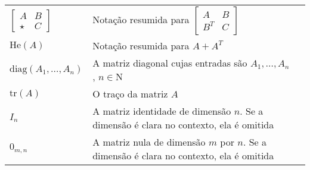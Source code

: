 \begin{spacing}{1.45}
\begin{longtable}{L{3.5cm}L{12cm}L{\textwidth}}
$\begin{bmatrix} A & B \\ \star & C \end{bmatrix}$ & Notação resumida para $\begin{bmatrix} A & B \\ B^T & C \end{bmatrix}$ & \\[12pt]

$\mathrm{He}(A)$ & Notação resumida para $A + A^T$ & \\[8pt]

$\mathrm{diag}(A_1, \ldots, A_n)$ & A matriz diagonal cujas entradas são $A_1, \ldots, A_n$, $n \in \mathrm{N}$  & \\[8pt]

$\mathrm{tr}(A)$ & O traço da matriz $A$  & \\[8pt]

$I_n$ & A matriz identidade de dimensão $n$. Se a dimensão é clara no contexto, ela é omitida & \\[8pt]

$0_{m, n}$ & A matriz nula de dimensão $m$ por $n$. Se a dimensão é clara no contexto, ela é omitida & \\[8pt]


\end{longtable}

\end{spacing}
